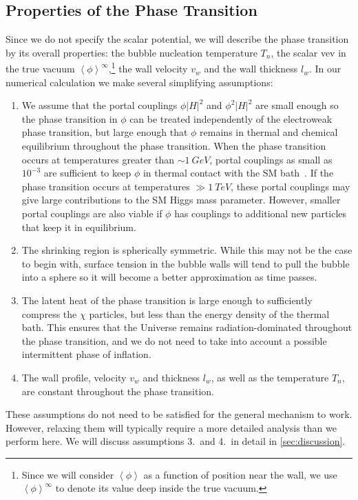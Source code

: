 \documentclass[
onecolumn, %
11pt, %
tightenlines,
superscriptaddress, %
nofootinbib, %
preprintnumbers, %
prd %
]{revtex4-1}
\newcommand{\ev}[1]{\ensuremath{\left\langle #1 %
        \right\rangle}} %
\begin{document}
\subsection{Properties of the Phase Transition}
\label{sec:pt-properties}

Since we do not specify the scalar potential, we will describe the phase transition by its overall properties: the bubble nucleation temperature $T_n$, the scalar vev in the true vacuum $\ev{\phi}^\infty$,\footnote{Since we will consider $\ev{\phi}$ as a function of position near the wall, we use $\ev{\phi}^\infty$ to denote its value deep inside the true vacuum.} the wall velocity $v_w$ and the wall thickness $l_w$.  In our numerical calculation we make several simplifying assumptions:
%
\begin{enumerate}
    \item We assume that the portal couplings $\phi |H|^2$ and $\phi^2 |H|^2$ are small enough so the phase transition in $\phi$ can be treated independently of the electroweak phase transition, but large enough that $\phi$ remains in thermal and chemical equilibrium throughout the phase transition.  When the phase transition occurs at temperatures greater than $\sim \SI{1}{GeV}$, portal couplings as small as $10^{-3}$ are sufficient to keep $\phi$ in thermal contact with the SM bath~\cite{Baker:2017zwx}.  If the phase transition occurs at temperatures $\gg \SI{1}{TeV}$, these portal couplings may give large contributions to the SM Higgs mass parameter.  However, smaller portal couplings are also viable if $\phi$ has couplings to additional new particles that keep it in equilibrium.
    
    \item The shrinking region is spherically symmetric.  While this may not be the case to begin with, surface tension in the bubble walls will tend to pull the bubble into a sphere so it will become a better approximation as time passes.
    
    \item The latent heat of the phase transition is large enough to sufficiently compress the $\chi$ particles, but less than the energy density of the thermal bath.  This ensures that the Universe remains radiation-dominated throughout the phase transition, and we do not need to take into account a possible intermittent phase of inflation.
    
    \item The wall profile, velocity $v_w$ and thickness $l_w$, as well as the temperature $T_n$, are constant throughout the phase transition.
\end{enumerate}
%
These assumptions do not need to be satisfied for the general mechanism to work.  However, relaxing them will typically require a more detailed analysis than we perform here.  We will discuss assumptions 3.~and 4.~in detail in \cref{sec:discussion}.
\end{document}
